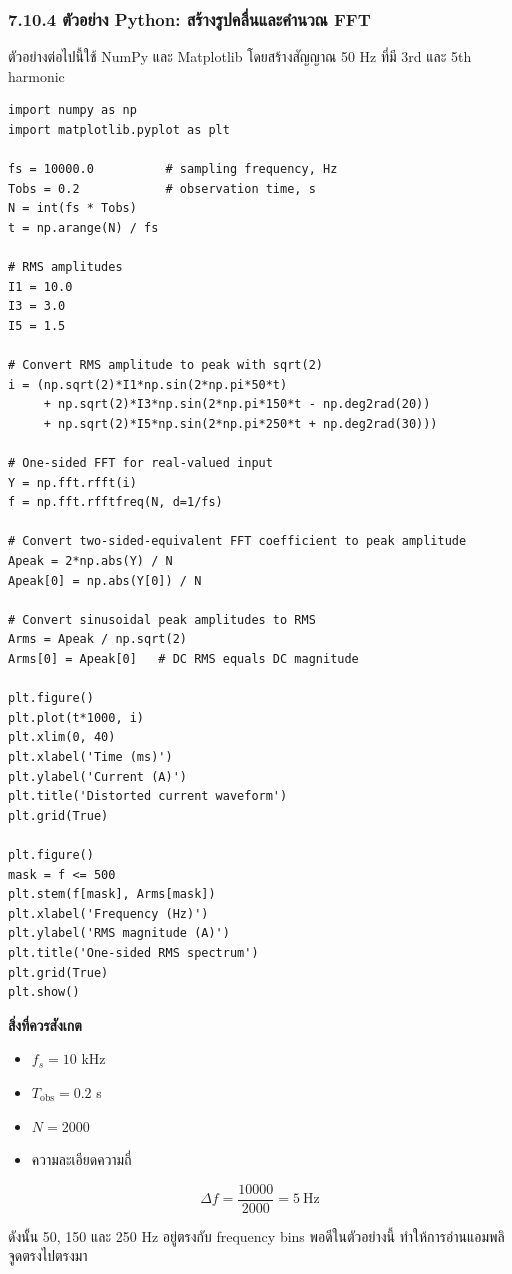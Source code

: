 \subsubsection{7.10.4 ตัวอย่าง Python: สร้างรูปคลื่นและคำนวณ FFT}

ตัวอย่างต่อไปนี้ใช้ NumPy และ Matplotlib โดยสร้างสัญญาณ 50 Hz ที่มี 3rd และ 5th harmonic

\begin{verbatim}
import numpy as np
import matplotlib.pyplot as plt

fs = 10000.0          # sampling frequency, Hz
Tobs = 0.2            # observation time, s
N = int(fs * Tobs)
t = np.arange(N) / fs

# RMS amplitudes
I1 = 10.0
I3 = 3.0
I5 = 1.5

# Convert RMS amplitude to peak with sqrt(2)
i = (np.sqrt(2)*I1*np.sin(2*np.pi*50*t)
     + np.sqrt(2)*I3*np.sin(2*np.pi*150*t - np.deg2rad(20))
     + np.sqrt(2)*I5*np.sin(2*np.pi*250*t + np.deg2rad(30)))

# One-sided FFT for real-valued input
Y = np.fft.rfft(i)
f = np.fft.rfftfreq(N, d=1/fs)

# Convert two-sided-equivalent FFT coefficient to peak amplitude
Apeak = 2*np.abs(Y) / N
Apeak[0] = np.abs(Y[0]) / N

# Convert sinusoidal peak amplitudes to RMS
Arms = Apeak / np.sqrt(2)
Arms[0] = Apeak[0]   # DC RMS equals DC magnitude

plt.figure()
plt.plot(t*1000, i)
plt.xlim(0, 40)
plt.xlabel('Time (ms)')
plt.ylabel('Current (A)')
plt.title('Distorted current waveform')
plt.grid(True)

plt.figure()
mask = f <= 500
plt.stem(f[mask], Arms[mask])
plt.xlabel('Frequency (Hz)')
plt.ylabel('RMS magnitude (A)')
plt.title('One-sided RMS spectrum')
plt.grid(True)
plt.show()
\end{verbatim}

\textbf{สิ่งที่ควรสังเกต}

\begin{itemize}
    \item $f_s=10$ kHz
    \item $T_{\mathrm{obs}}=0.2$ s
    \item $N=2000$
    \item ความละเอียดความถี่
\end{itemize}

\[
\Delta f=\frac{10000}{2000}=5\ \text{Hz}
\]

ดังนั้น 50, 150 และ 250 Hz อยู่ตรงกับ frequency bins พอดีในตัวอย่างนี้ ทำให้การอ่านแอมพลิจูดตรงไปตรงมา

